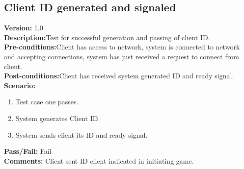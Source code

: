 \documentclass[12pt]{article}
\begin{document}
    \subsection{Client ID generated and signaled}
    \textbf{Version:} 1.0\\
    \textbf{Description:}Test for successful generation and passing of client ID.\\
    \textbf{Pre-conditions:}Client has access to network, system is connected to network and accepting connections, system has just received a request to connect from client.\\
    \textbf{Post-conditions:}Client has received system generated ID and ready signal.\\
    \textbf{Scenario:}
    \begin{enumerate}
        \item Test case one passes.
        \item System generates Client ID.
        \item System sends client its ID and ready signal.
    \end{enumerate}
    \textbf{Pass/Fail:} Fail\\
    \textbf{Comments:} Client sent ID client indicated in initiating game.\\
\end{document}

